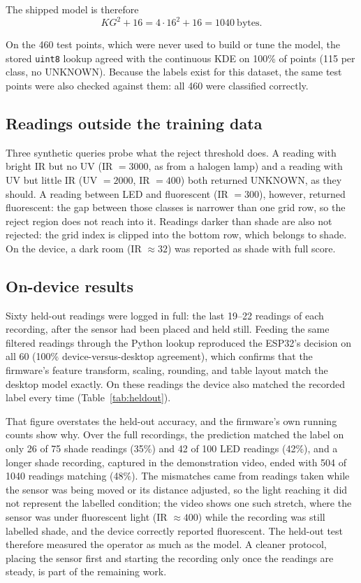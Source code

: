 \documentclass[10pt,a4paper,twocolumn]{article}
\begin{document}
The shipped model is therefore
\begin{equation}
K G^2 + 16 = 4\cdot 16^2 + 16 = 1040\ \text{bytes}.
\label{eq:flash}
\end{equation}

On the 460 test points, which were never used to build or tune the model, the stored \texttt{uint8} lookup agreed with the continuous KDE on 100\% of points (115 per class, no UNKNOWN). Because the labels exist for this dataset, the same test points were also checked against them: all 460 were classified correctly.

\subsection{Readings outside the training data}

Three synthetic queries probe what the reject threshold does. A reading with bright IR but no UV (IR $=3000$, as from a halogen lamp) and a reading with UV but little IR (UV $=2000$, IR $=400$) both returned UNKNOWN, as they should. A reading between LED and fluorescent (IR $=300$), however, returned fluorescent: the gap between those classes is narrower than one grid row, so the reject region does not reach into it. Readings darker than shade are also not rejected: the grid index is clipped into the bottom row, which belongs to shade. On the device, a dark room (IR $\approx 32$) was reported as shade with full score.

\subsection{On-device results}

Sixty held-out readings were logged in full: the last 19--22 readings of each recording, after the sensor had been placed and held still. Feeding the same filtered readings through the Python lookup reproduced the ESP32's decision on all 60 (100\% device-versus-desktop agreement), which confirms that the firmware's feature transform, scaling, rounding, and table layout match the desktop model exactly. On these readings the device also matched the recorded label every time (Table~\ref{tab:heldout}).

That figure overstates the held-out accuracy, and the firmware's own running counts show why. Over the full recordings, the prediction matched the label on only 26 of 75 shade readings (35\%) and 42 of 100 LED readings (42\%), and a longer shade recording, captured in the demonstration video, ended with 504 of 1040 readings matching (48\%). The mismatches came from readings taken while the sensor was being moved or its distance adjusted, so the light reaching it did not represent the labelled condition; the video shows one such stretch, where the sensor was under fluorescent light (IR $\approx 400$) while the recording was still labelled shade, and the device correctly reported fluorescent. The held-out test therefore measured the operator as much as the model. A cleaner protocol, placing the sensor first and starting the recording only once the readings are steady, is part of the remaining work.
\end{document}
